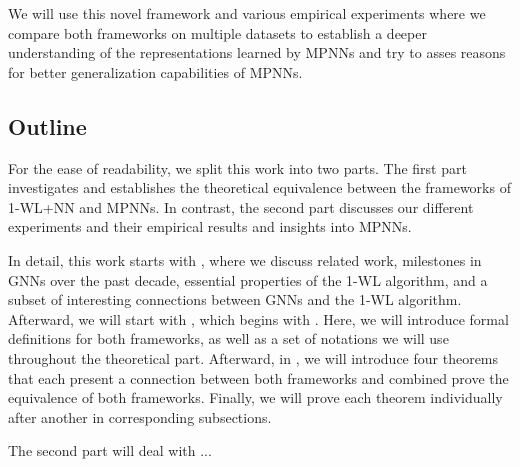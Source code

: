 We will use this novel framework and various empirical experiments where we compare both frameworks on multiple datasets to establish a deeper understanding of the representations learned by MPNNs and try to asses reasons for better generalization capabilities of MPNNs.


\subsection{Outline}
For the ease of readability, we split this work into two parts. The first part investigates and establishes the theoretical equivalence between the frameworks of 1-WL+NN and MPNNs. In contrast, the second part discusses our different experiments and their empirical results and insights into MPNNs.

In detail, this work starts with , where we discuss related work, milestones in GNNs over the past decade, essential properties of the 1-WL algorithm, and a subset of interesting connections between GNNs and the 1-WL algorithm. Afterward, we will start with , which begins with . Here, we will introduce formal definitions for both frameworks, as well as a set of notations we will use throughout the theoretical part. Afterward, in , we will introduce four theorems that each present a connection between both frameworks and combined prove the equivalence of both frameworks. Finally, we will prove each theorem individually after another in corresponding subsections.

The second part will deal with ...



\newpage